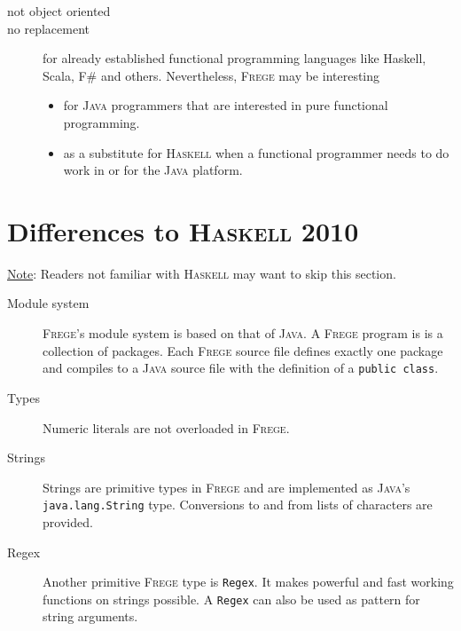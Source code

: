 \documentclass[lletterpaper,12pt]{report}
\newcommand{\boxquote}[3]{
\begin{center}
\colorbox{#1}%
{\parbox{0.9\textwidth}{
\sf
\underline{#2}:
#3
}}
\end{center}}
\newcommand{\note}[1]{\boxquote{grau}{Note}{#1}}
\newcommand{\haskell}[0]{\textsc{Haskell}}
\newcommand{\frege}[0]{\textsc{Frege}}
\newcommand{\java}[0]{\textsc{Java}}
\begin{document}
\begin{description}

\item[not object oriented]

\item[no replacement]

for already established functional programming languages like Haskell,
Scala, F\# and others.
Nevertheless, \frege{} may be interesting
\begin{itemize}
\item for \java{} programmers that are interested in pure functional programming. 
\item as a substitute for \haskell{} when a functional programmer needs to do work in or for the \java{} platform. 
\end{itemize}

\end{description}

\section{Differences to \haskell{} 2010}

\note{Readers not familiar with \haskell{} may want to skip this
section.}

\begin{description}
\item[Module system]
\frege{}'s module system is based on that of \java{}. A \frege{}
program is is a collection of packages. Each \frege{}
source file defines exactly one package
and compiles to a \java{} source file with the definition of a
\texttt{public class}.


\item[Types]

Numeric literals are not overloaded in \frege{}. 

\item[Strings]
Strings are primitive types in \frege{} and are implemented
as \java{}'s \texttt{java.lang.String} type.
Conversions to and
from lists of characters are provided.

\item[Regex]
\par Another primitive \frege{} type is \texttt{Regex}. It makes
powerful
and fast working functions on strings possible. A \texttt{Regex} can
also
be used as pattern for string arguments.

\end{description}
\end{document}
